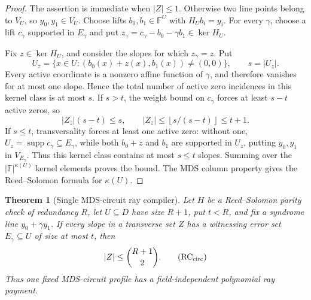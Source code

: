 \documentclass[11pt,a4paper]{amsart}
\numberwithin{equation}{section}
\newtheorem{theorem}{Theorem}[section]
\theoremstyle{remark}
\DeclareMathOperator{\supp}{supp}
\newcommand{\F}{\mathbb F}
\newcommand{\abs}[1]{\lvert #1\rvert}
\newcommand{\floor}[1]{\left\lfloor #1\right\rfloor}
\begin{document}
\begin{proof}
The assertion is immediate when \(\abs Z\le1\).  Otherwise two line
points belong to \(V_U\), so \(y_0,y_1\in V_U\).  Choose lifts
\(b_0,b_1\in\F^U\) with \(H_Ub_i=y_i\).  For every \(\gamma\), choose a
lift \(c_\gamma\) supported in \(E_\gamma\) and put
\(z_\gamma=c_\gamma-b_0-\gamma b_1\in\ker H_U\).

Fix \(z\in\ker H_U\), and consider the slopes for which
\(z_\gamma=z\).  Put
\[
 U_z=\{x\in U:(b_0(x)+z(x),b_1(x))\ne(0,0)\},
 \qquad s=\abs{U_z}.
\]
Every active coordinate is a nonzero affine function of \(\gamma\), and
therefore vanishes for at most one slope.  Hence the total number of active
zero incidences in this kernel class is at most \(s\).  If \(s>t\), the
weight bound on \(c_\gamma\) forces at least \(s-t\) active zeros, so
\[
 \abs{Z_z}(s-t)\le s,\qquad
 \abs{Z_z}\le\floor{s/(s-t)}\le t+1.
\]
If \(s\le t\), transversality forces
at least one active zero: without one,
\(U_z=\supp c_\gamma\subseteq E_\gamma\), while both \(b_0+z\) and
\(b_1\) are supported in \(U_z\), putting \(y_0,y_1\) in
\(V_{E_\gamma}\).  Thus this kernel class contains at most \(s\le t\)
slopes.  Summing over the \(\abs{\F}^{\kappa(U)}\) kernel elements proves
the bound.  The MDS column property gives the Reed--Solomon formula for
\(\kappa(U)\).
\end{proof}

\begin{theorem}[Single MDS-circuit ray compiler]
\label{thm:single-mds-circuit-ray}
Let \(H\) be a Reed--Solomon parity check of redundancy \(R\), let
\(U\subseteq D\) have size \(R+1\), put \(t<R\), and fix a syndrome line
\(y_0+\gamma y_1\).  If every slope in a transverse set \(Z\) has a witnessing error set
\(E_\gamma\subseteq U\) of size at most \(t\), then
\[
                         \abs Z\le\binom{R+1}{2}.   \tag{RC$_{\rm circ}$}
\]
Thus one fixed MDS-circuit profile has a field-independent polynomial ray
payment.
\end{theorem}
\end{document}
